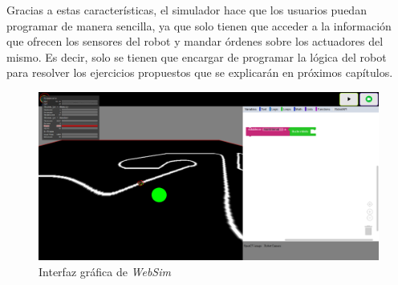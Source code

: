 Gracias a estas características, el simulador hace que los usuarios puedan programar de manera sencilla, ya que solo tienen que acceder a la información que ofrecen los sensores del robot y mandar órdenes sobre los actuadores del mismo. Es decir, solo  se tienen que encargar de programar la lógica del robot para resolver los ejercicios propuestos que se explicarán en próximos capítulos. 

\begin{figure}[H]
    \centering
    \includegraphics[width=1\textwidth]{img/interfaz-websim.png}
    \caption{Interfaz gráfica de \textit{WebSim}} \label{fig:websim}
\end{figure}

